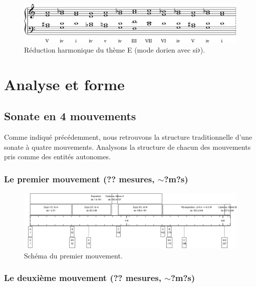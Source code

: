 \begin{figure}[!ht]
  \begin{bigcenter}
    \includegraphics[width=15cm, keepaspectratio]{religioso.pdf}
  \end{bigcenter}
  \caption{\label{sonate-theme-5-reduction}Réduction harmonique du thème E (mode dorien avec si$\flat$).}
\end{figure}

\section{Analyse et forme}

\subsection{Sonate en 4 mouvements}

Comme indiqué précédemment, nous retrouvons la structure traditionnelle d'une sonate à quatre mouvements. Analysons la structure de chacun des mouvements pris comme des entités autonomes.

\subsubsection*{Le premier mouvement (?? mesures, $\sim$?m?s)}

\begin{figure}[!ht]
  \begin{bigcenter}
    \includegraphics[width=15cm, keepaspectratio]{frise-mvt1.png}
  \end{bigcenter}
  \caption{\label{schema-1}Schéma du premier mouvement.}
\end{figure}

\subsubsection*{Le deuxième mouvement (?? mesures, $\sim$?m?s)}


